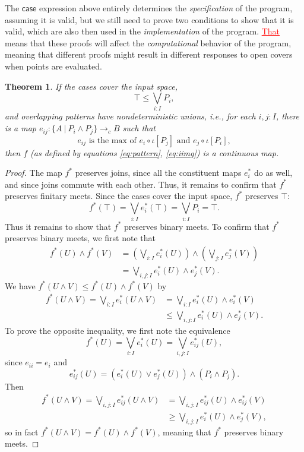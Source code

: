 \documentclass[conference]{IEEEtran}
\newtheorem{theorem}{Theorem}
\newcommand{\cto}{\to_c}
\newcommand{\suchthat}{\ |\ }
\newcommand{\oinclf}[1]{\iota[{#1}]}
\newcommand{\isthemaxof}[3]{{#1}\text{ is the max of }{#2}\text{ and }{#3}}
\newcommand{\iimg}[1]{#1^*}
\newcommand{\grammar}[1]{\textcolor{red}{\underline{#1}}}
\begin{document}
The $\mathsf{case}$ expression above entirely determines the \emph{specification} of the program, assuming it is valid, but we still need to prove two conditions to show that it is valid, which are also then used in the \emph{implementation} of the program. \grammar{That} means that these proofs will affect the \emph{computational} behavior of the program, meaning that different proofs might result in different responses to open covers when points are evaluated. 
\begin{theorem}
\label{pattern}
If the cases cover the input space,
\[
\top \le \bigvee_{i : I} P_i \tag{covering},
\]
and overlapping patterns have nondeterministic unions, i.e., for each $i, j : I$, there is a map $e_{ij} : \{A \suchthat P_i \wedge P_j \} \cto B$ such that
\[
\isthemaxof{ e_{ij} }{ e_i \circ \oinclf{P_j} }{ e_j \circ \oinclf{P_i} }, \tag{gluing}
\]
then $f$ (as defined by equations \ref{eq:pattern}, \ref{eq:iimg})
is a continuous map.
\end{theorem}
\begin{proof}
The map $\iimg{f}$ preserves joins, since all the constituent maps $\iimg{e_i}$ do as well, and since joins commute with each other. Thus, it remains to confirm that $\iimg{f}$ preserves finitary meets.
Since the cases cover the input space, $\iimg{f}$ preserves $\top$:
\[
\iimg{f}(\top) = \bigvee_{i : I} \iimg{e_i}(\top) = \bigvee_{i : I}P_i = \top.
\]
Thus it remains to show that $\iimg{f}$ preserves binary meets.
To confirm that $\iimg{f}$ preserves binary meets, we first note that
\begin{align*}
\iimg{f}(U) \wedge \iimg{f}(V) 
  &= \left(\bigvee_{i : I} \iimg{e_i}(U) \right) \wedge \left( \bigvee_{j: I} \iimg{e_j}(V) \right)
\\ &= \bigvee_{i, j : I} \iimg{e_i}(U) \wedge \iimg{e_j}(V).
\end{align*}
We have $\iimg{f}(U \wedge V) \le \iimg{f}(U) \wedge \iimg{f}(V)$ by
\begin{align*}
\iimg{f}(U \wedge V)
  = \bigvee_{i : I} \iimg{e_i}(U \wedge V)
  &= \bigvee_{i : I} \iimg{e_i}(U) \wedge \iimg{e_i}(V)
  \\ &\le \bigvee_{i, j : I} \iimg{e_i}(U) \wedge \iimg{e_j}(V).
\end{align*}
To prove the opposite inequality, we first note the equivalence
\[
\iimg{f}(U) = \bigvee_{i : I} \iimg{e_i}(U) = \bigvee_{i, j : I} \iimg{e_{ij}}(U),
\]
since $e_{ii} = e_i$ and 
\[
\iimg{e_{ij}}(U) = \left( \iimg{e_i}(U) \vee \iimg{e_j}(U) \right) \wedge \left(P_i \wedge P_j \right).
\]
Then
\begin{align*}
\iimg{f}(U \wedge V)
  = \bigvee_{i, j : I} \iimg{e_{ij}}(U \wedge V)
  &= \bigvee_{i, j : I} \iimg{e_{ij}}(U) \wedge \iimg{e_{ij}}(V)
  \\ &\ge \bigvee_{i, j : I} \iimg{e_i}(U) \wedge \iimg{e_j}(V),
\end{align*}
so in fact $\iimg{f}(U \wedge V) = \iimg{f}(U) \wedge \iimg{f}(V)$, meaning that $\iimg{f}$ preserves binary meets.
\end{proof}
\end{document}
